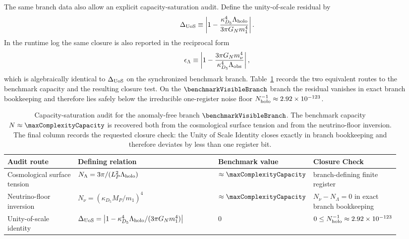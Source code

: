 \documentclass[11pt]{article}
\begin{document}
The same branch data also allow an explicit capacity-saturation audit. Define
the unity-of-scale residual by
\begin{equation}
\label{eq:s4-unity-of-scale-residual}
 \Delta_{\rm UoS}
 \equiv
 \left|1-\frac{\kappa_{D_5}^4\Lambda_{\rm holo}}{3\pi G_N m_1^4}\right|.
\end{equation}
In the runtime log the same closure is also reported in the reciprocal form
\begin{equation}
 \epsilon_{\Lambda}
 \equiv
 \left|1-\frac{3\pi G_N m_{\nu}^4}{\kappa_{D_5}^4\Lambda_{\rm obs}}\right|,
\end{equation}
which is algebraically identical to $\Delta_{\rm UoS}$ on the synchronized
benchmark branch.
Table~\ref{tab:s4-capacity-saturation-audit} records the two equivalent routes
to the benchmark capacity and the resulting closure test. On the
$\benchmarkVisibleBranch$ branch the residual vanishes in exact branch
bookkeeping and therefore lies safely below the irreducible one-register noise
floor $N_{\rm holo}^{-1}\approx 2.92\times10^{-123}$.

\begin{table}[t]
\centering
\scriptsize
\setlength{\tabcolsep}{4pt}
\renewcommand{\arraystretch}{1.15}
\begin{tabular}{>{\raggedright\arraybackslash}p{0.19\linewidth}>{\raggedright\arraybackslash}p{0.37\linewidth}>{\centering\arraybackslash}p{0.18\linewidth}>{\raggedright\arraybackslash}p{0.18\linewidth}}
\hline
Audit route & Defining relation & Benchmark value & Closure Check \\
\hline
Cosmological surface tension & $N_{\Lambda}=3\pi/(L_P^2\Lambda_{\rm holo})$ & $\approx\maxComplexityCapacity$ & branch-defining finite register \\

Neutrino-floor inversion & $N_{\nu}=(\kappa_{D_5}M_P/m_1)^4$ & $\approx\maxComplexityCapacity$ & $N_{\nu}-N_{\Lambda}=0$ in exact branch bookkeeping \\

Unity-of-scale identity & $\Delta_{\rm UoS}=\left|1-\kappa_{D_5}^4\Lambda_{\rm holo}/(3\pi G_N m_1^4)\right|$ & $0$ & $0\leq N_{\rm holo}^{-1}\approx 2.92\times10^{-123}$ \\
\hline
\end{tabular}
\caption{Capacity-saturation audit for the anomaly-free branch $\benchmarkVisibleBranch$. The benchmark capacity $N\approx\maxComplexityCapacity$ is recovered both from the cosmological surface tension and from the neutrino-floor inversion. The final column records the requested closure check: the Unity of Scale Identity closes exactly in branch bookkeeping and therefore deviates by less than one register bit.}
\label{tab:s4-capacity-saturation-audit}
\end{table}
\end{document}
